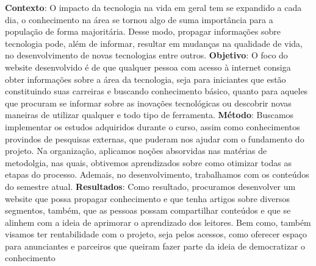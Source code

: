 

\centeredchapterstyle
\begin{resumo}
    \noindent\textbf{Contexto}: O impacto da tecnologia na vida em geral tem se expandido a cada dia, o conhecimento na área se tornou algo de suma importância para a população de forma majoritária. Desse modo, propagar informações sobre tecnologia pode, além de informar, resultar em mudanças na qualidade de vida, no desenvolvimento de novas tecnologias entre outros. \textbf{Objetivo}: O foco do website desenvolvido é de que qualquer pessoa com acesso à internet consiga obter informações sobre a área da tecnologia, seja para iniciantes que estão constituindo suas carreiras e buscando conhecimento básico, quanto para aqueles que procuram se informar sobre as inovações tecnológicas ou descobrir novas maneiras de utilizar qualquer e todo tipo de ferramenta. \textbf{Método}: Buscamos implementar os estudos adquiridos durante o curso, assim como conhecimentos provindos de pesquisas externas, que puderam nos ajudar com o fundamento do projeto. Na organização, aplicamos noções absorvidas nas matérias de metodolgia, nas quais, obtivemos aprendizados sobre como otimizar todas as etapas do processo. Ademais, no desenvolvimento, trabalhamos com os conteúdos do semestre atual. \textbf{Resultados}: Como resultado, procuramos desenvolver um website que possa propagar conhecimento e que tenha artigos sobre diversos segmentos, também, que as pessoas possam compartilhar conteúdos e que se alinhem com a ideia de aprimorar o aprendizado dos leitores. 
    Bem como, também visamos ter rentabilidade com o projeto, seja pelos acessos, como oferecer espaço para anunciantes e parceiros que queiram fazer parte da ideia de democratizar o conhecimento
\end{resumo}